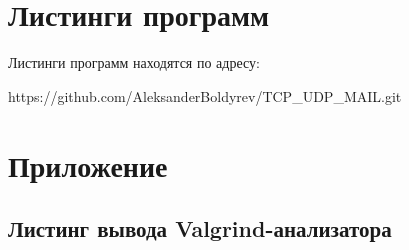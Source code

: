 \section{Листинги программ}

Листинги программ находятся по адресу: 

https://github.com/AleksanderBoldyrev/TCP\_UDP\_MAIL.git

\section{Приложение}
\subsection{Листинг вывода Valgrind-анализатора}
 



